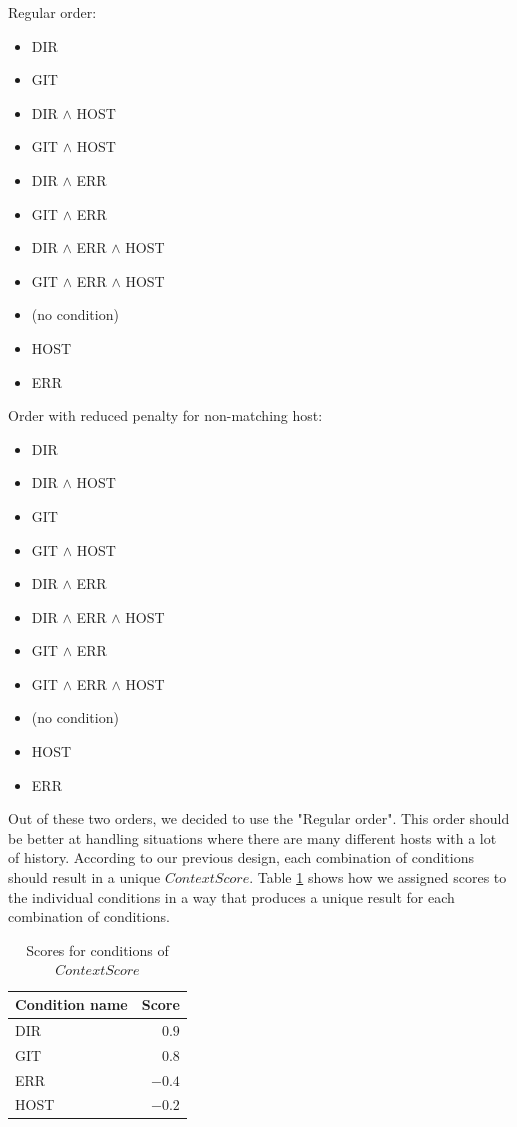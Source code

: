 \begin{multicols}{2}[]
Regular order:
\begin{itemize}
\item DIR
\item GIT
\item DIR \(\wedge\) HOST
\item GIT \(\wedge\) HOST
\item DIR \(\wedge\) ERR
\item GIT \(\wedge\) ERR
\item DIR \(\wedge\) ERR \(\wedge\) HOST 
\item GIT \(\wedge\) ERR \(\wedge\) HOST
\item (no condition)
\item HOST
\item ERR
\end{itemize}

Order with reduced penalty for non-matching host:
\begin{itemize}
\item DIR
\item DIR \(\wedge\) HOST
\item GIT
\item GIT \(\wedge\) HOST
\item DIR \(\wedge\) ERR
\item DIR \(\wedge\) ERR \(\wedge\) HOST
\item GIT \(\wedge\) ERR
\item GIT \(\wedge\) ERR \(\wedge\) HOST
\item (no condition)
\item HOST
\item ERR
\end{itemize}
\end{multicols}

Out of these two orders, we decided to use the "Regular order". This order should be better at handling situations where there are many different hosts with a lot of history. According to our previous design, each combination of conditions should result in a unique \(ContextScore\). Table \ref{tab:score-context-impl-values} shows how we assigned scores to the individual conditions in a way that produces a unique result for each combination of conditions.

\begin{table}[h!]
\centering
\begin{tabular}{lr}
\hline \hline
Condition name & Score \\
\hline
DIR & \(0.9\) \\ 
GIT & \(0.8\) \\ 
ERR & \(-0.4\) \\
HOST & \(-0.2\) \\ 
\hline \hline
\end{tabular}
\caption{Scores for conditions of \(ContextScore\)}
\label{tab:score-context-impl-values}
\end{table}

